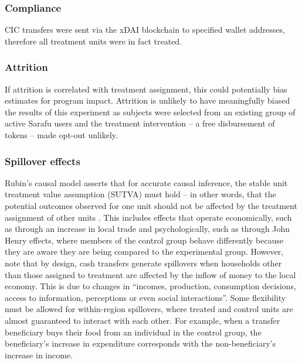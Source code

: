 \documentclass[12pt]{article}
\begin{document}
\subsubsection{Compliance}
CIC transfers were sent via the xDAI blockchain to specified wallet addresses, therefore all treatment units were in fact treated.

\subsubsection{Attrition}
If attrition is correlated with treatment assignment, this could potentially bias estimates for program impact. Attrition is unlikely to have meaningfully biased the results of this experiment as subjects were selected from an existing group of active Sarafu users and the treatment intervention – a free disbursement of tokens – made opt-out unlikely.

\subsubsection{Spillover effects}
Rubin’s causal model asserts that for accurate causal inference, the stable unit treatment value assumption (SUTVA) must hold – in other words, that the potential outcomes observed for one unit should not be affected by the treatment assignment of other units \citep{rubin1990formal}. This includes effects that operate economically, such as through an increase in local trade and psychologically, such as through John Henry effects, where members of the control group behave differently because they are aware they are being compared to the experimental group. However, \cite{thome2016local} note that by design, cash transfers generate spillovers when households other than those assigned to treatment are affected by the inflow of money to the local economy. This is due to changes in “incomes, production, consumption decisions, access to information, perceptions or even social interactions”. Some flexibility must be allowed for within-region spillovers, where treated and control units are almost guaranteed to interact with each other. For example, when a transfer beneficiary buys their food from an individual in the control group, the beneficiary’s increase in expenditure corresponds with the non-beneficiary’s increase in income.
\end{document}
